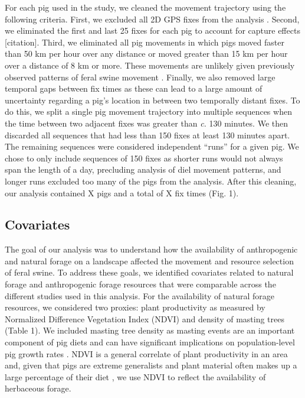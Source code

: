 \documentclass[a4paper]{article}
\begin{document}
For each pig used in the study, we cleaned the movement trajectory using the following criteria. First, we excluded all 2D GPS fixes from the analysis \citep{Bjorneraas2010}.  Second, we eliminated the first and last 25 fixes for each pig to account for capture effects [citation]. Third, we eliminated all pig movements in which pigs moved faster than 50 km per hour over any distance or moved greater than 15 km per hour over a distance of 8 km or more. These movements are unlikely given previously observed patterns of feral swine movement \citep{Mayer2009}. Finally, we also removed large temporal gaps between fix times as these can lead to a large amount of uncertainty regarding a pig's location in between two temporally distant fixes. To do this, we split a single pig movement trajectory into multiple sequences when the time between two adjacent fixes was greater than \emph{c.} 130 minutes. We then discarded all sequences that had less than 150 fixes at least 130 minutes apart. The remaining sequences were considered independent ``runs'' for a given pig. We chose to only include sequences of 150 fixes as shorter runs would not always span the length of a day, precluding analysis of diel movement patterns, and longer runs excluded too many of the pigs from the analysis. After this cleaning, our analysis contained X pigs and a total of X fix times (Fig. 1).

\subsection*{Covariates}

The goal of our analysis was to understand how the availability of anthropogenic and natural forage on a landscape affected the movement and resource selection of feral swine. To address these goals, we identified covariates related to natural forage and anthropogenic forage resources that were comparable across the different studies used in this analysis.  For the availability of natural forage resources, we considered two proxies: plant productivity as measured by Normalized Difference Vegetation Index (NDVI) and density of masting trees (Table 1). We included masting tree density as masting events are an important component of pig diets and can have significant implications on population-level pig growth rates \citep[e.g.][]{Bieber2005}.  NDVI is a general correlate of plant productivity in an area \citep{Pettorelli2005} and, given that pigs are extreme generalists and plant material often makes up a large percentage of their diet \citep{Mayer2009}, we use NDVI to reflect the availability of herbaceous forage.  
\end{document}
